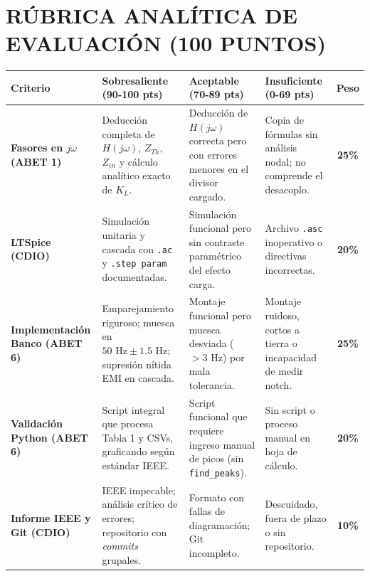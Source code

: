 \documentclass[11pt,a4paper,twoside]{article}
\begin{document}
\section{RÚBRICA ANALÍTICA DE EVALUACIÓN (100 PUNTOS)}
\begin{table}[h!]
    \centering
    \small
    \renewcommand{\arraystretch}{1.5}
    \begin{tabularx}{\textwidth}{|>{\raggedright\arraybackslash}p{2.5cm}|>{\raggedright\arraybackslash}X|>{\raggedright\arraybackslash}X|>{\raggedright\arraybackslash}X|c|}
        \hline
        \textbf{Criterio} & \textbf{Sobresaliente (90-100 pts)} & \textbf{Aceptable (70-89 pts)} & \textbf{Insuficiente (0-69 pts)} & \textbf{Peso} \\
        \hline
        \textbf{Fasores en \texorpdfstring{$j\omega$}{jw} (ABET 1)} & Deducción completa de $H(j\omega)$, $Z_{Th}$, $Z_{in}$ y cálculo analítico exacto de $K_L$. & Deducción de $H(j\omega)$ correcta pero con errores menores en el divisor cargado. & Copia de fórmulas sin análisis nodal; no comprende el desacoplo. & \textbf{25\%} \\
        \hline
        \textbf{LTSpice (CDIO)} & Simulación unitaria y cascada con \texttt{.ac} y \texttt{.step param} documentadas. & Simulación funcional pero sin contraste paramétrico del efecto carga. & Archivo \texttt{.asc} inoperativo o directivas incorrectas. & \textbf{20\%} \\
        \hline
        \textbf{Implementación Banco (ABET 6)} & Emparejamiento riguroso; muesca en $50\text{ Hz} \pm 1.5\text{ Hz}$; supresión nítida EMI en cascada. & Montaje funcional pero muesca desviada ($>3\text{ Hz}$) por mala tolerancia. & Montaje ruidoso, cortos a tierra o incapacidad de medir notch. & \textbf{25\%} \\
        \hline
        \textbf{Validación Python (ABET 6)} & Script integral que procesa Tabla 1 y CSVs, graficando según estándar IEEE. & Script funcional que requiere ingreso manual de picos (sin \texttt{find\_peaks}). & Sin script o proceso manual en hoja de cálculo. & \textbf{20\%} \\
        \hline
        \textbf{Informe IEEE y Git (CDIO)} & IEEE impecable; análisis crítico de errores; repositorio con \textit{commits} grupales. & Formato con fallas de diagramación; Git incompleto. & Descuidado, fuera de plazo o sin repositorio. & \textbf{10\%} \\
        \hline
    \end{tabularx}
\end{table}
\end{document}
